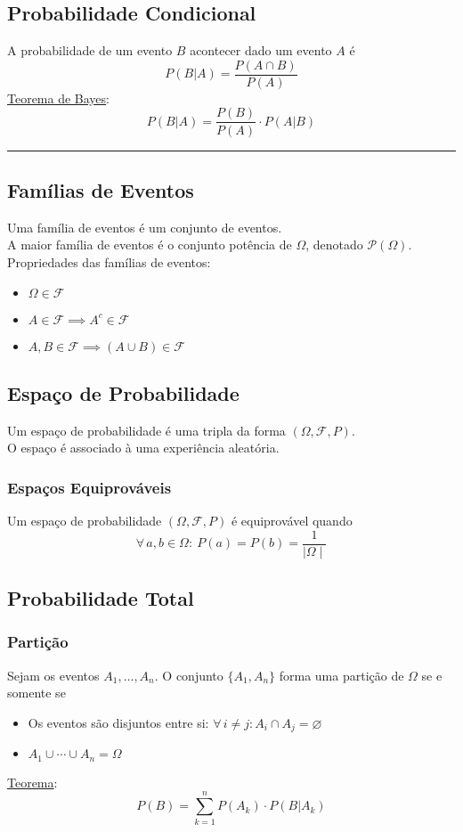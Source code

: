 \documentclass{article}
\begin{document}
\subsection{Probabilidade Condicional}
A probabilidade de um evento $B$ acontecer dado um evento $A$ é
\[ P(B|A) = \frac{P(A \cap B)}{P(A)} \]
\uline{Teorema de Bayes}:
\[ P(B|A) = \frac{P(B)}{P(A)} \cdot P(A|B) \]



\hrule

\subsection{Famílias de Eventos}
Uma família de eventos é um conjunto de eventos. \\
A maior família de eventos é o conjunto potência de $\Omega$, denotado $\mathcal{P}(\Omega)$. \\[5pt]
Propriedades das famílias de eventos:
\begin{itemize}
  \item $\Omega \in \mathcal{F}$
  \item $A \in \mathcal{F} \implies A^c \in \mathcal{F}$
  \item $A, B \in \mathcal{F} \implies (A \cup B) \in \mathcal{F}$
\end{itemize}


\subsection{Espaço de Probabilidade}
Um espaço de probabilidade é uma tripla da forma $(\Omega, \mathcal{F}, P)$. \\
O espaço é associado à uma experiência aleatória.

\subsubsection{Espaços Equiprováveis}
Um espaço de probabilidade $(\Omega, \mathcal{F}, P)$ é equiprovável quando
\[ \forall \, a, b \in \Omega: \> P({a}) = P({b}) = \frac{1}{\mid \Omega \mid} \]


\subsection{Probabilidade Total}

\subsubsection{Partição}
Sejam os eventos $A_1, \hdots, A_n$. O conjunto $\{ A_1, A_n \}$ forma uma partição de $\Omega$ se e somente se
\begin{itemize}
  \item Os eventos são disjuntos entre si: $\forall \, i \neq j: A_i \cap A_j = \varnothing$
  \item $A_1 \cup \cdots \cup A_n = \Omega$
\end{itemize}
\uline{Teorema}:
\[ P(B) = \sum_{k = 1}^{n} P(A_k) \cdot P(B|A_k) \]
\end{document}
